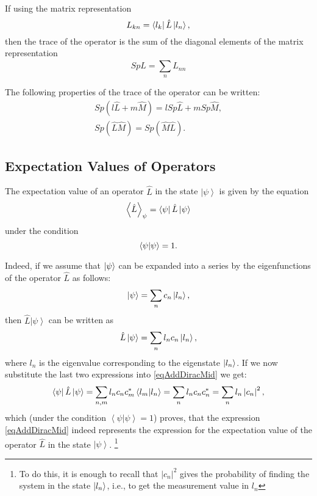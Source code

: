 If using the matrix representation 
\[
L_{kn} = \bra{l_k} \hat{L} \ket{l_n}, 
\]
then the trace of the operator is the sum of the diagonal elements of the matrix 
representation
\[
Sp \hat{L} = \sum_n L_{nn}
\]

The following properties of the trace of the operator can be written:
\begin{eqnarray}
Sp\left(l \hat{L} + m \hat{M}\right) = 
l Sp \hat{L} + m Sp \hat{M},
\nonumber \\
Sp\left(\hat{L}\hat{M}\right) = 
Sp\left(\hat{M}\hat{L}\right).
\label{eqAddDiracTrProperty}
\end{eqnarray}

\subsection{Expectation Values of Operators}
The expectation value of an operator $\hat{L}$ in the state $\left| \psi
\right>$ is given by the equation 
\begin{equation}  
\left< \hat{L} \right>_{\psi} = \bra{\psi}\hat{L}\ket{\psi}
\label{eqAddDiracMid}
\end{equation}  
under the condition
\[
\bra{\psi}\ket{\psi} = 1.
\]

Indeed, if we assume that $\ket{\psi}$ can be expanded into
a series by the eigenfunctions of the operator $\hat{L}$ as follows:
\[
\ket{\psi} = \sum_n c_n \ket{l_n},
\]
then $\hat{L}\left|\psi\right>$ can be written as
\[
\hat{L}\ket{\psi} = \sum_n l_n c_n \ket{l_n},
\]
where $l_n$ is the eigenvalue corresponding to the eigenstate 
$\ket{l_n}$. 
If we now substitute the last two expressions into \eqref{eqAddDiracMid}
we get:
\[
\bra{\psi}\hat{L}\ket{\psi} = \sum_{n,m} 
l_n c_n c_m^{*} \bra{l_m}\ket{l_n}=
\sum_n l_n c_n c_n^{*} = 
\sum_n l_n \left|c_n\right|^2, 
\]
which (under the condition $\left<\psi\right.\left|\psi\right> = 1$) proves,
that the expression \eqref{eqAddDiracMid} indeed 
represents the expression for the expectation value of the operator 
$\hat{L}$ in the state $\left|\psi\right>$.
\footnote{To do this, it is enough to recall that $\left|c_n\right|^2$
  gives the probability of finding the system in the state $\ket{l_n}$,
  i.e., to get the measurement value in $l_n$}

